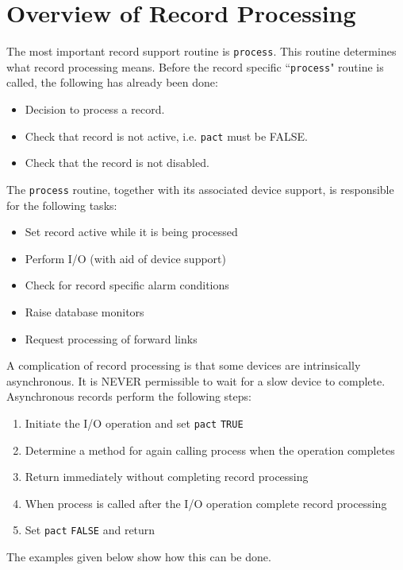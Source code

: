 \section{Overview of Record Processing}

The most important record support routine is \verb|process|. This routine determines what record processing means. Before 
the record specific ``\verb|process|" routine is called, the following has already been done:

\begin{itemize}\item Decision to process a record.

\item Check that record is not active, i.e. \verb|pact| must be FALSE.

\item Check that the record is not disabled.

\end{itemize}The \verb|process| routine, together with its associated device support, is responsible for the following tasks:

\begin{itemize}\item Set record active while it is being processed

\item Perform I/O (with aid of device support)

\item Check for record specific alarm conditions

\item Raise database monitors

\item Request processing of forward links

\end{itemize}A complication of record processing is that some devices are intrinsically asynchronous. It is NEVER permissible to wait 
for a slow device to complete. Asynchronous records perform the following steps:

\begin{enumerate}\item Initiate the I/O operation and set \verb|pact| \verb|TRUE|

\item Determine a method for again calling process when the operation completes

\item Return immediately without completing record processing

\item When process is called after the I/O operation complete record processing

\item Set \verb|pact| \verb|FALSE| and return

\end{enumerate}The examples given below show how this can be done.

